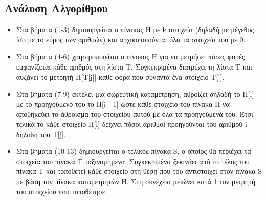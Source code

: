 \documentclass[a4paper]{article}
\begin{document}
\begin{itemize}
\subsection*{Ανάλυση Αλγορίθμου}
\begin{itemize}
\item Στα βήματα (1-3) δημιουργείται ο πίνακας H με k στοιχεία (δηλαδή  με μέγεθος ίσο με το εύρος των αριθμών) και αρχικοποιούνται όλα τα στοιχεία του με 0.
\item Στα βήματα (4-6) χρησιμοποιείται ο πίνακας H για να μετρήσει πόσες φορές εμφανίζεται κάθε αριθμός στη λίστα T. Συγκεκριμένα διατρέχει τη λίστα T και αυξάνει το μετρητή H[T[j]] κάθε φορά που συναντά ένα στοιχείο T[j].
\item Στα βήματα (7-9) εκτελεί μια σωρευτική καταμέτρηση, αθροίζει δηλαδή το H[i] με το προηγούμενό του το H[i - 1] ώστε κάθε στοιχείο του πίνακα H να αποθηκεύει το άθροισμα του στοιχείου αυτού με όλα τα προηγούμενά του. Έτσι τελικά το κάθε στοιχείο H[i] δείχνει πόσοι αριθμοί προηγούνται του αριθμού i δηλαδη του T[j].
\item Στα βήματα (10-13) δημιουργείται ο τελικός πίνακα S, ο οποίος θα περιέχει τα στοιχεία του πίνακα T ταξινομημένα. Συγκεκριμένα ξεκινάει από το τέλος του πίνακα T και τοποθετεί κάθε στοιχείο στη θέση που του αντιστοιχεί στον πίνακα S με βάση τον πίνακα καταμετρητών H. Στη συνέχεια μειώνει κατά 1 τον μετρητή του στοιχείου που τοποθέτησε.
\end{itemize}


\end{itemize}
\end{document}
